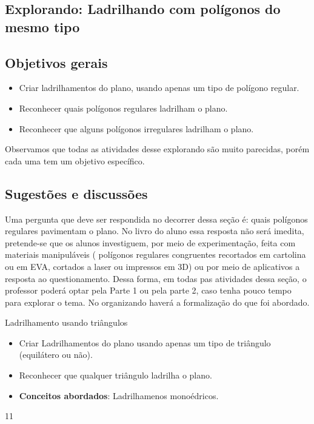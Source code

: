 \clearpage
\def\currentcolor{session1}
\begin{texto}
{
	\section{Explorando: Ladrilhando com polígonos do mesmo tipo}
	\subsection{Objetivos gerais}
	\begin{itemize}
	\item Criar ladrilhamentos do plano, usando apenas um tipo de polígono regular.
	\item Reconhecer quais polígonos regulares ladrilham o plano.
	\item Reconhecer que alguns polígonos irregulares ladrilham o plano.
	\end{itemize}


	Observamos que todas as atividades desse explorando são muito parecidas, porém cada uma tem um objetivo específico.

	\subsection{Sugestões e discussões}

	Uma pergunta que deve ser respondida no decorrer dessa seção é: quais polígonos regulares pavimentam o plano. No livro do aluno essa resposta não será imedita, pretende-se que os alunos investiguem, por meio de experimentação, feita com materiais manipuláveis ( polígonos regulares congruentes recortados em cartolina ou em EVA, cortados a laser ou impressos em 3D) ou por meio de aplicativos a resposta ao questionamento. Dessa forma, em todas pas atividades dessa seção, o professor poderá optar pela Parte 1 ou pela parte 2, caso tenha pouco tempo para explorar o tema. No organizando haverá a formalização do que foi abordado.  
}
\end{texto}
\begin{objectives}{Ladrilhamento usando triângulos}
{
	\begin{itemize}
	\item Criar Ladrilhamentos do plano usando apenas um tipo de triângulo (equilátero ou não).
	\item Reconhecer que qualquer triângulo ladrilha o plano.
	\item \textbf{Conceitos abordados}: Ladrilhamenos monoédricos.
	\end{itemize}
}{1}{1}
\end{objectives}
